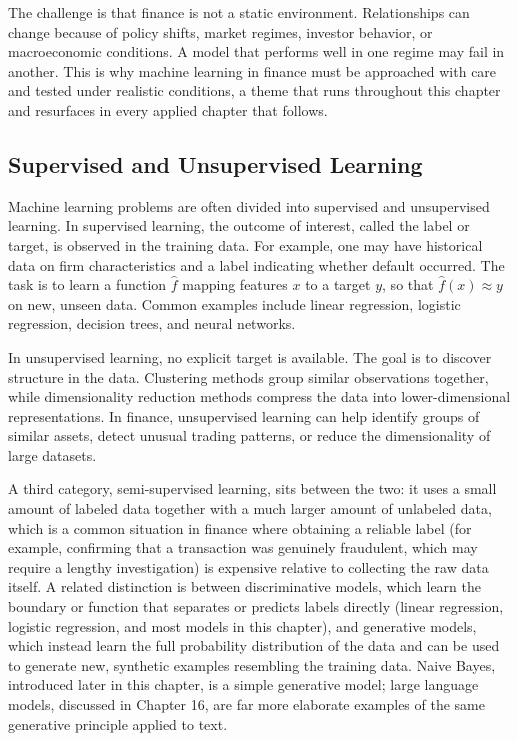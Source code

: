 \documentclass[../ai_in_finance]{subfiles}
\begin{document}
The challenge is that finance is not a static environment. Relationships can change because of policy shifts, market regimes, investor behavior, or macroeconomic conditions. A model that performs well in one regime may fail in another. This is why machine learning in finance must be approached with care and tested under realistic conditions, a theme that runs throughout this chapter and resurfaces in every applied chapter that follows.

\subsection{Supervised and Unsupervised Learning}

Machine learning problems are often divided into supervised and unsupervised learning. In supervised learning, the outcome of interest, called the label or target, is observed in the training data. For example, one may have historical data on firm characteristics and a label indicating whether default occurred. The task is to learn a function $\hat f$ mapping features $x$ to a target $y$, so that $\hat f(x) \approx y$ on new, unseen data. Common examples include linear regression, logistic regression, decision trees, and neural networks.

In unsupervised learning, no explicit target is available. The goal is to discover structure in the data. Clustering methods group similar observations together, while dimensionality reduction methods compress the data into lower-dimensional representations. In finance, unsupervised learning can help identify groups of similar assets, detect unusual trading patterns, or reduce the dimensionality of large datasets.

A third category, semi-supervised learning, sits between the two: it uses a small amount of labeled data together with a much larger amount of unlabeled data, which is a common situation in finance where obtaining a reliable label (for example, confirming that a transaction was genuinely fraudulent, which may require a lengthy investigation) is expensive relative to collecting the raw data itself. A related distinction is between discriminative models, which learn the boundary or function that separates or predicts labels directly (linear regression, logistic regression, and most models in this chapter), and generative models, which instead learn the full probability distribution of the data and can be used to generate new, synthetic examples resembling the training data. Naive Bayes, introduced later in this chapter, is a simple generative model; large language models, discussed in Chapter 16, are far more elaborate examples of the same generative principle applied to text.
\end{document}

